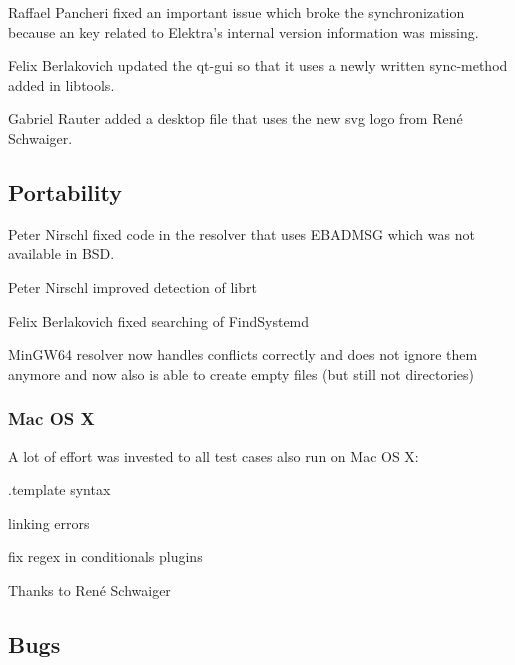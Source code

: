 Raffael Pancheri fixed an important issue which broke the synchronization because an key related to Elektra's internal version information was missing.

Felix Berlakovich updated the qt-\/gui so that it uses a newly written sync-\/method added in libtools.

Gabriel Rauter added a desktop file that uses the new svg logo from René Schwaiger.

\subsection*{Portability}


\begin{DoxyItemize}
\item Peter Nirschl fixed code in the resolver that uses E\+B\+A\+D\+M\+S\+G which was not available in B\+S\+D.
\item Peter Nirschl improved detection of librt
\item Felix Berlakovich fixed searching of Find\+Systemd
\item Min\+G\+W64 resolver now handles conflicts correctly and does not ignore them anymore and now also is able to create empty files (but still not directories)
\end{DoxyItemize}

\subsubsection*{Mac O\+S X}

A lot of effort was invested to all test cases also run on Mac O\+S X\+:


\begin{DoxyItemize}
\item .template syntax
\item linking errors
\item fix regex in conditionals plugins
\end{DoxyItemize}

Thanks to René Schwaiger

\subsection*{Bugs}


